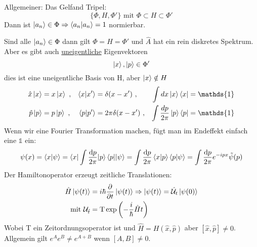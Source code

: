 		Allgemeiner: Das Gelfand Tripel:
			\begin{equation*}
				\{\Phi, H, \Phi'\} \text{~mit~} \Phi \subset H \subset \Phi'
			\end{equation*}
		Dann ist $\ket{a_n} \in \Phi \Rightarrow \braket{a_n | a_n} = 1$ normierbar.
		
		Sind alle $\ket{a_n} \in \Phi$ dann gilt $\Phi = H = \Phi'$ und $\hat{A}$ hat ein rein diskretes Spektrum.
		Aber es gibt auch \underline{uneigentliche} Eigenvektoren
			\begin{equation*}
				\ket{x}, \ket{p} \in \Phi'
			\end{equation*}
		dies ist eine uneigentliche Basis von H, aber $\ket{x} \notin H$
			\begin{align*}
				\hat{x} \ket{x} &= x \ket{x} ~,& \braket{ x | x'} &= \delta(x-x') ~,& \int dx \ket{x} \bra{x} &= \mathds{1} \\		
				\hat{p} \ket{p} &= p \ket{p} ~,& \braket{ p|p'} &= 2\pi \delta (x-x') ~,& \int \frac{dp}{2\pi} \ket{p} \bra{p} &= \mathds{1}
			\end{align*}		
		Wenn wir eine Fourier Transformation machen, fügt man im Endeffekt einfach eine $\mathds{1}$ ein:
			\begin{align*}
				\psi(x) =
				\braket{ x|\psi } = \braket{x | \int \frac{\mathrm{d} p}{2\pi} | p} \braket{p | |\psi} =
				\int \frac{\mathrm{d} p}{2\pi} \braket{x|p} \braket{p|\psi} = 
				\int \frac{\mathrm{d} p}{2\pi} e^{-ipx} \tilde{\psi}(p)
			\end{align*}
		Der Hamiltonoperator erzeugt zeitliche Translationen:
			\begin{align*}
				\hat{H} \ket{\psi(t)} &= i\hbar \frac{\partial}{\partial t} \ket{\psi(t)}
				\Rightarrow \ket{\psi(t)} = \hat{\mathcal{U}}_t \ket{\psi(0)} \\
				\text{mit~} \mathcal{U}_{\hat{t}} &= \text{T} \exp \left( -\frac{i}{\hbar} \hat{H} t \right)
			\end{align*}
		Wobei T ein Zeitordnungsoperator ist und $\hat{H}=H(\hat{x}, \hat{p})$ aber $[\hat{x}, \hat{p}] \neq 0$. 
		Allgemein gilt $e^A e^B \neq e^{A+B}$ wenn $[A,B] \neq 0$.
		
